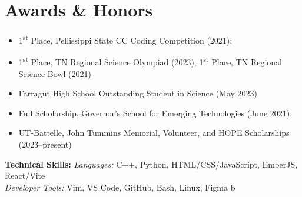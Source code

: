 \documentclass[11pt,a4paper]{article}
\begin{document}

\section*{Awards \& Honors}
\begin{itemize}[leftmargin=*, topsep=0pt, itemsep=2pt, parsep=0pt]
  \item 1\textsuperscript{st} Place, Pellissippi State CC Coding Competition (2021);
  \item 1\textsuperscript{st} Place, TN Regional Science Olympiad (2023); 1\textsuperscript{st} Place, TN Regional Science Bowl (2021)
  \item Farragut High School Outstanding Student in Science (May 2023)
  \item Full Scholarship, Governor’s School for Emerging Technologies (June 2021); 
  \item UT-Battelle, John Tummins Memorial, Volunteer, and HOPE Scholarships (2023–present)
\end{itemize}

\textbf{Technical Skills: }
\textit{Languages:} C++, Python, HTML/CSS/JavaScript, EmberJS, React/Vite \\ 
\textit{Developer Tools:} Vim, VS Code, GitHub, Bash, Linux, Figma b

\end{document}
